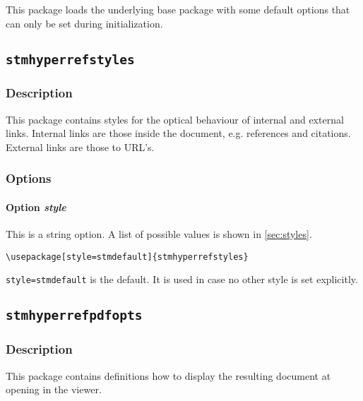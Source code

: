 \documentclass[%
  type=article,%
  layout=koma,%
  conditionallox=true,%
  conditionalloxnewpage=false,%
  date=true,%
  index=true,%
  listings=true%
]{stmtext}
\begin{document}
This package loads the underlying base package with some default options that can only be set during initialization.

\subsection{\protect\texttt{stmhyperrefstyles}}
\label{sec:usage:preamble:styles}

\subsubsection{Description}
\label{sec:usage:preamble:styles:description}

This package contains styles for the optical behaviour of internal and external links. Internal links are those inside the document, e.g. references and citations. External links are those to URL's.

\subsubsection{Options}
\label{sec:usage:preamble:styles:options}

\paragraph{Option \protect\textit{style}} 
\label{sec:usage:preamble:styles:options:style}

This is a string option. A list of possible values is shown in \cref{sec:styles}.

\begin{verbatim}
\usepackage[style=stmdefault]{stmhyperrefstyles}
\end{verbatim}

\texttt{style=stmdefault} is the default. It is used in case no other style is set explicitly.

\subsection{\protect\texttt{stmhyperrefpdfopts}}
\label{sec:usage:preamble:pdfopts}

\subsubsection{Description}
\label{sec:usage:preamble:pdfopts:description}

This package contains definitions how to display the resulting document at opening in the viewer.
\end{document}
